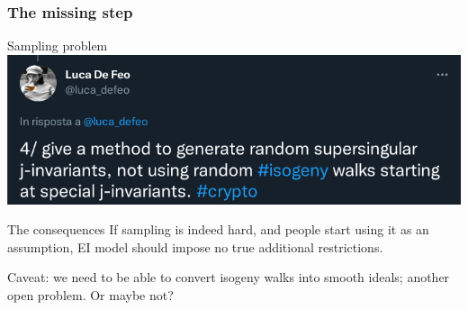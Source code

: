 \documentclass{beamer}
\begin{document}
    \begin{frame}
        \frametitle{The missing step}
        
        \begin{block}{Sampling problem}
            \includegraphics[width=\linewidth]{images/DeFeo_twitter}
        \end{block}
    
        \begin{block}{The consequences}
            If sampling is indeed hard, and people start using it as an assumption, EI model should impose no true additional restrictions.
            
            Caveat: we need to be able to convert isogeny walks into smooth ideals; another open problem. Or maybe not?
        \end{block}
   
    \end{frame}
\end{document}
